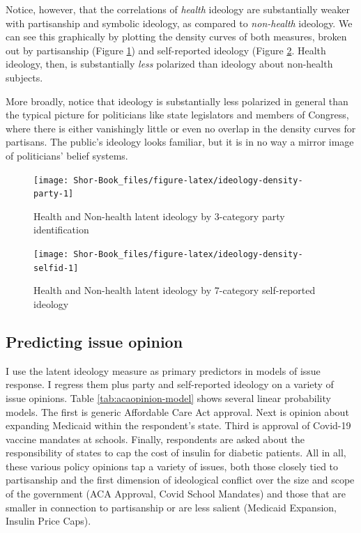 \documentclass[
  oneside]{book}
\begin{document}
Notice, however, that the correlations of \emph{health} ideology are substantially weaker with partisanship and symbolic ideology, as compared to \emph{non-health} ideology. We can see this graphically by plotting the density curves of both measures, broken out by partisanship (Figure \ref{fig:ideology-density-party}) and self-reported ideology (Figure \ref{fig:ideology-density-selfid}. Health ideology, then, is substantially \emph{less} polarized than ideology about non-health subjects.

More broadly, notice that ideology is substantially less polarized in general than the typical picture for politicians like state legislators and members of Congress, where there is either vanishingly little or even no overlap in the density curves for partisans. The public's ideology looks familiar, but it is in no way a mirror image of politicians' belief systems.

\begin{figure}
\texttt{[image: Shor-Book\_files/figure-latex/ideology-density-party-1]} \caption{Health and Non-health latent ideology by 3-category party identification}\label{fig:ideology-density-party}
\end{figure}

\begin{figure}
\texttt{[image: Shor-Book\_files/figure-latex/ideology-density-selfid-1]} \caption{Health and Non-health latent ideology by 7-category self-reported ideology}\label{fig:ideology-density-selfid}
\end{figure}

\hypertarget{predicting-issue-opinion}{%
\subsection{Predicting issue opinion}\label{predicting-issue-opinion}}

I use the latent ideology measure as primary predictors in models of issue response. I regress them plus party and self-reported ideology on a variety of issue opinions. Table \ref{tab:acaopinion-model} shows several linear probability models. The first is generic Affordable Care Act approval. Next is opinion about expanding Medicaid within the respondent's state. Third is approval of Covid-19 vaccine mandates at schools. Finally, respondents are asked about the responsibility of states to cap the cost of insulin for diabetic patients. All in all, these various policy opinions tap a variety of issues, both those closely tied to partisanship and the first dimension of ideological conflict over the size and scope of the government (ACA Approval, Covid School Mandates) and those that are smaller in connection to partisanship or are less salient (Medicaid Expansion, Insulin Price Caps).
\end{document}
